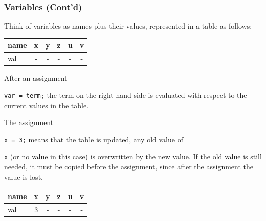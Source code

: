 \documentclass{beamer}
\def\textttb#1{\mcolor{blue}{\texttt{#1}}}
\def\mcolor#1#2{\rule{0ex}{0ex}\color{#1}#2\color{black}{}}
\begin{document}
\begin{frame}
\frametitle{Variables (Cont'd)}
Think of variables as names plus their values, represented in a
table as follows:
\mcolor{red}{\begin{center}
\begin{tabular}{|l||c|c|c|c|c|}\hline
	  name &  x  &  y  &  z  &  u  &  v \\\hline
	  val  &  -  &  -  &  -  &  -  &  - \\\hline
\end{tabular}
\end{center}}

After an assignment \textttb{var = term;} the term on the right hand side is
evaluated with respect to the current values in the table.

The assignment \textttb{x = 3;} means that the table is updated, any
old value of \textttb{x} (or no value in this case) is overwritten by
the new value. If the old value is
still needed, it must be copied before the assignment,
since after the assignment the value is lost.
\mcolor{red}{\begin{center}
\begin{tabular}{|l||c|c|c|c|c|}\hline
	  name &  x  &  y  &  z  &  u  &  v \\\hline
	  val  &  3  &  -  &  -  &  -  &  - \\\hline
\end{tabular}
\end{center}}
\end{frame}
\end{document}
